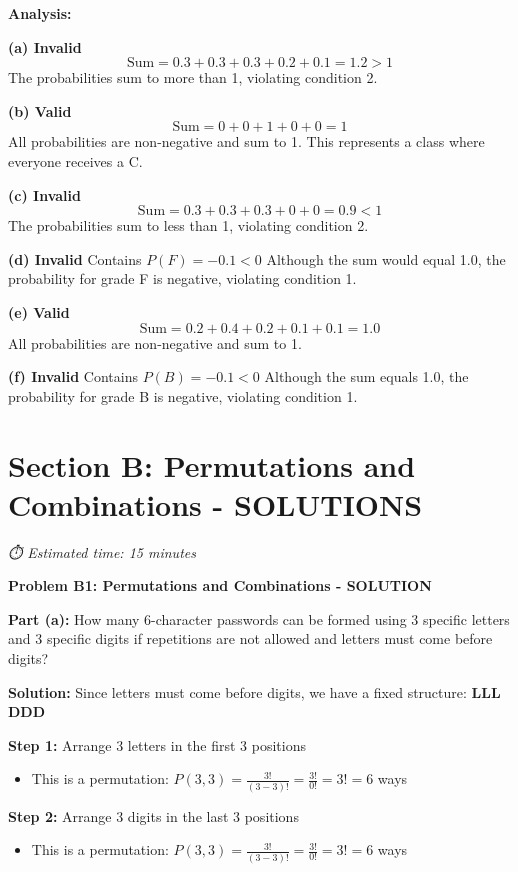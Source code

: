 \documentclass[
  11pt,
]{article}
\providecommand{\tightlist}{%
  \setlength{\itemsep}{0pt}\setlength{\parskip}{0pt}}\usepackage{longtable,booktabs,array}
\begin{document}
\textbf{Analysis:}

\textbf{(a) Invalid}
\[\text{Sum} = 0.3 + 0.3 + 0.3 + 0.2 + 0.1 = 1.2 > 1\] The probabilities
sum to more than 1, violating condition 2.

\textbf{(b) Valid} \[\text{Sum} = 0 + 0 + 1 + 0 + 0 = 1\] All
probabilities are non-negative and sum to 1. This represents a class
where everyone receives a C.

\textbf{(c) Invalid} \[\text{Sum} = 0.3 + 0.3 + 0.3 + 0 + 0 = 0.9 < 1\]
The probabilities sum to less than 1, violating condition 2.

\textbf{(d) Invalid} Contains \(P(F) = -0.1 < 0\) Although the sum would
equal 1.0, the probability for grade F is negative, violating condition
1.

\textbf{(e) Valid} \[\text{Sum} = 0.2 + 0.4 + 0.2 + 0.1 + 0.1 = 1.0\]
All probabilities are non-negative and sum to 1.

\textbf{(f) Invalid} Contains \(P(B) = -0.1 < 0\) Although the sum
equals 1.0, the probability for grade B is negative, violating condition
1.

\section{Section B: Permutations and Combinations -
SOLUTIONS}\label{section-b-permutations-and-combinations---solutions}

\emph{⏱️ Estimated time: 15 minutes}

\textbf{Problem B1: Permutations and Combinations - SOLUTION}

\textbf{Part (a):} How many 6-character passwords can be formed using 3
specific letters and 3 specific digits if repetitions are not allowed
and letters must come before digits?

\textbf{Solution:} Since letters must come before digits, we have a
fixed structure: \textbf{LLL DDD}

\textbf{Step 1:} Arrange 3 letters in the first 3 positions

\begin{itemize}
\tightlist
\item
  This is a permutation:
  \(P(3,3) = \frac{3!}{(3-3)!} = \frac{3!}{0!} = 3! = 6\) ways
\end{itemize}

\textbf{Step 2:} Arrange 3 digits in the last 3 positions

\begin{itemize}
\tightlist
\item
  This is a permutation:
  \(P(3,3) = \frac{3!}{(3-3)!} = \frac{3!}{0!} = 3! = 6\) ways
\end{itemize}
\end{document}

